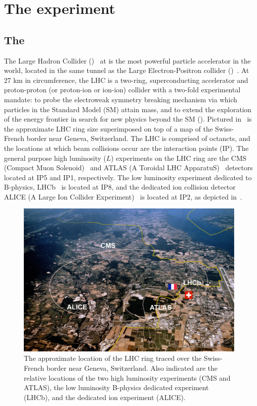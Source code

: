 \chapter{The \CMS experiment}
\label{chap:CMS}

\section{The \LHC}
\label{sec:LHC}

The Large Hadron Collider (\LHC)~\cite{Bruning:2004ej} at \CERN is the most powerful particle accelerator in the world, located in the same tunnel as the Large Electron-Positron collider (\LEP)~\cite{Brianti:2004qq}. At 27 km in circumference, the LHC is a two-ring, superconducting accelerator and proton-proton (or proton-ion or ion-ion) collider with a two-fold experimental mandate: to probe the electroweak symmetry breaking mechanism via which particles in the Standard Model (SM) attain mass, and to extend the exploration of the energy frontier in search for new physics beyond the SM (\BSM). Pictured in~ is the approximate LHC ring size superimposed on top of a map of the Swiss-French border near Geneva, Switzerland. The LHC is comprised of octancts, and the locations at which beam collisions occur are the interaction points (IP). The general purpose high luminosity ($L$) experiments on the LHC ring are the CMS (Compact Muon Solenoid)~\cite{Chatrchyan:2008aa} and ATLAS (A Toroidal LHC ApparatuS)~\cite{Aad:2008zzm} detectors located at IP5 and IP1, respectively. The low luminosity experiment dedicated to B-physics, LHCb~\cite{Alves:2008zz} is located at IP8, and the dedicated ion collision detector ALICE (A Large Ion Collider Experiment)~\cite{Aamodt:2008zz} is located at IP2, as depicted in~.

\begin{figure}
  \centering
  \includegraphics[width=\textwidth]{figs/lhc.jpg}
  \caption{The approximate location of the LHC ring traced over the Swiss-French border near Geneva, Switzerland. Also indicated are the relative locations of the two high luminosity experiments (CMS and ATLAS), the low luminosity B-physics dedicated experiment (LHCb), and the dedicated ion experiment (ALICE).}
  \label{fig:LHC}
\end{figure}

